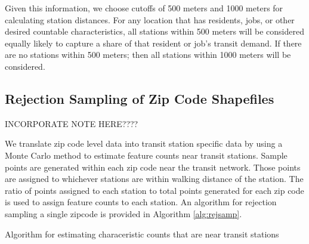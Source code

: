 \documentclass[11pt]{article}
\begin{document}
Given this information, we choose cutoffs of 500 meters and 1000 meters for calculating station distances. For any location that has residents, jobs, or other desired countable characteristics, all stations within 500 meters will be considered equally likely to capture a share of that resident or job's transit demand. If there are no stations within 500 meters; then all stations within 1000 meters will be considered. 

\subsection{Rejection Sampling of Zip Code Shapefiles}\label{sec:sampling}

INCORPORATE NOTE HERE????

We translate zip code level data into transit station specific data by using a Monte Carlo method to estimate feature counts near transit stations. Sample points are generated within each zip code near the transit network. Those points are assigned to whichever stations are within walking distance of the station. The ratio of points assigned to each station to total points generated for each zip code is used to assign feature counts to each station. An algorithm for rejection sampling a single zipcode is provided in Algorithm \ref{alg:rejsamp}.


\begin{algorithm}\begingroup\fontsize{10}{10}\selectfont
\begin{algorithmic}
	\EndIf
\EndWhile
{}
		\EndFor
		\EndFor
	\EndIf
\EndFor
\end{algorithmic}\endgroup\caption{Algorithm for estimating characeristic counts that are near transit stations}\label{alg:rejsamp}
\end{algorithm}
\end{document}

